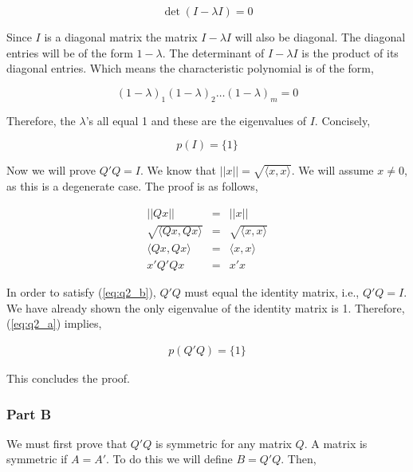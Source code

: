 \begin{equation}
  \det(I - \lambda I)=0
\end{equation}

Since \(I\) is a diagonal matrix the matrix \(I - \lambda I\) will also be diagonal.
The diagonal entries will be of the form \(1 - \lambda\).
The determinant of \(I - \lambda I\) is the product of its diagonal entries.
Which means the characteristic polynomial is of the form,

\begin{equation}
  {(1 - \lambda)}_1 {(1 - \lambda)}_2 \ldots {(1 - \lambda)}_m = 0
\end{equation}

Therefore, the \(\lambda\)'s all equal 1 and these are the eigenvalues of \(I\).
Concisely,

\begin{equation}
  \boxed{p(I) = \{1\}}
  \label{eq:q2_a}
\end{equation}

Now we will prove \(Q'Q = I\).
We know that \(||x|| = \sqrt{\langle x,x \rangle}\).
We will assume \(x \ne 0\), as this is a degenerate case.
The proof is as follows,

\begin{eqnarray}
  ||Qx|| &=& ||x|| \\
  \sqrt{\langle Qx,Qx \rangle} &=& \sqrt{\langle x,x \rangle} \\
  \langle Qx,Qx \rangle &=& \langle x,x \rangle \\
  x'Q'Qx &=& x'x
  \label{eq:q2_b}
\end{eqnarray} 

In order to satisfy (\ref{eq:q2_b}), \(Q'Q\) must equal the identity matrix, i.e., \(Q'Q = I\).
We have already shown the only eigenvalue of the identity matrix is 1.
Therefore, (\ref{eq:q2_a}) implies,

\begin{eqnarray}
  \boxed{p(Q'Q) = \{1\}}
\end{eqnarray}

This concludes the proof.

\newpage
\subsubsection{Part B}

We must first prove that \(Q'Q\) is symmetric for any matrix \(Q\).
A matrix is symmetric if \(A = A'\).
To do this we will define \(B = Q'Q\).
Then,

